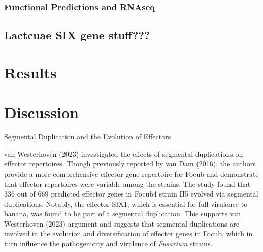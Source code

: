\subsubsection{Functional Predictions and RNAseq}

\subsection{Lactcuae SIX gene stuff???}

\newpage
\section{Results}

\newpage
\section{Discussion}

\ac{Segmental Duplication and the Evolution of Effectors}

van Westerhoven \et (2023) investigated the effects of segmental duplications on effector repertoires.  Though previously reported by van Dam \et (2016), the authors provide a more comprehensive effector gene repertoire for \ac{Focub} and demonstrate that effector repertoires were variable among the strains. The study found that 336 out of 669 predicted effector genes in \ac{Focub4} strain II5 evolved via segmental duplications. Notably, the effector SIX1, which is essential for full virulence to banana, was found to be part of a segmental duplication. This supports van Westerhoven \et (2023) argument and suggests that segmental duplications are involved in the evolution and diversification of effector genes in \ac{Focub}, which in turn influence the pathogenicity and virulence of \textit{Fusarium} strains.